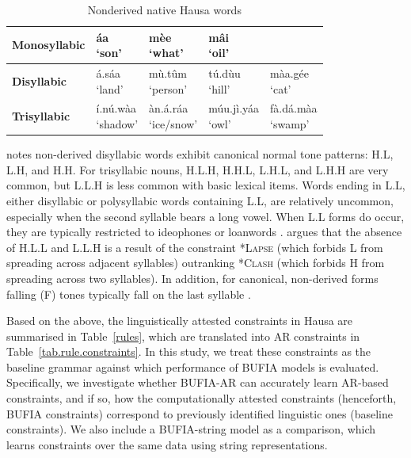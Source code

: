 \begin{table}[h!]
	\centering
	\renewcommand{\arraystretch}{2}
	\begin{tabular}{lllll}
		\hline
		
		\textbf{Monosyllabic} 
		& \makecell{\textipa{\texthtd}áa \\ `son’} 
		& \makecell{mèe \\ `what’} 
		& \makecell{mâi \\ `oil’} 
		
		&  \\ \hline
		\textbf{Disyllabic} 
		& \makecell{\textipa{\texthtk}á.sáa \\ `land’} 
		& \makecell{mù.tûm \\ `person’} 
		& \makecell{tú.dùu \\ `hill’} 
		& \makecell{màa.gée \\ `cat’}  \\
		\hline
		
		\textbf{Trisyllabic} 
		& \makecell{í.nú.wàa \\ `shadow’} 
		& \makecell{\textipa{\texthtk}àn.\textipa{\texthtk}á.ráa \\ `ice/snow’} 
		& \makecell{múu.jì.yáa \\ `owl'} 
		& \makecell{fà.dá.màa\\ `swamp'} \\ \hline
	\end{tabular}
	\caption{Nonderived native Hausa words \citep{wold-4}}
	\label{ex.hausa.words}
\end{table}

\citet[p.606]{Newmanbook} notes
non-derived disyllabic words exhibit canonical normal tone
patterns: H.L, L.H, and H.H. For trisyllabic nouns, H.L.H,
H.H.L, L.H.L, and L.H.H are very common, but L.L.H is less
common with basic lexical items. Words ending in L.L, either 
disyllabic or polysyllabic words containing L.L, are relatively uncommon, 
especially when the second syllable bears a long vowel. 
When L.L forms do occur, they are typically restricted to 
ideophones or loanwords \citep[p.606]{Newmanbook}. 
\citet{zoll2003optimal} argues that the absence of H.L.L
and L.L.H is a result of the constraint \textsc{*Lapse} (which
forbids L from spreading across adjacent syllables) outranking
\textsc{*Clash} (which forbids H from spreading across two syllables).
In addition, for canonical, non-derived forms falling (F) tones 
typically fall on the last syllable \citep[p.606]{Newmanbook}.

Based on the above, the linguistically attested constraints in Hausa 
are summarised in Table~\ref{rules}, which are translated into 
AR constraints in Table~\ref{tab.rule.constraints}. In this 
study, we treat these constraints as the baseline grammar against which 
performance of BUFIA models is evaluated. Specifically, we investigate 
whether BUFIA-AR can accurately learn AR-based constraints, and 
if so, how the computationally attested constraints (henceforth, 
BUFIA constraints) correspond to previously identified linguistic 
ones (baseline constraints). We also include a BUFIA-string model 
as a comparison, which learns constraints over the same 
data using string representations.

